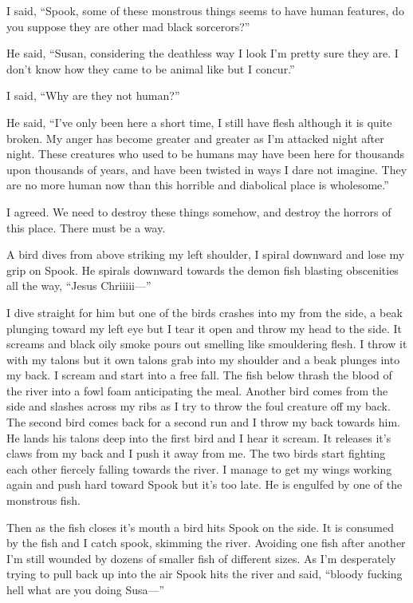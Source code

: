 I said, ``Spook, some of these monstrous things seems to have human features, do you suppose they are other mad black sorcerors?''

He said, ``Susan, considering the deathless way I look I'm pretty sure they are. I don't know how they came to be animal like but I concur.''

I said, ``Why are they not human?''

He said, ``I've only been here a short time, I still have flesh although it is quite broken. My anger has become greater and greater as I'm attacked night after night. These creatures who used to be humans may have been here for thousands upon thousands of years, and have been twisted in ways I dare not imagine. They are no more human now than this horrible and diabolical place is wholesome.''

I agreed. We need to destroy these things somehow, and destroy the horrors of this place. There must be a way.

A bird dives from above striking my left shoulder, I spiral downward and lose my grip on Spook. He spirals downward towards the demon fish blasting obscenities all the way, ``Jesus Chriiiii---''

I dive straight for him but one of the birds crashes into my from the side, a beak plunging toward my left eye but I tear it open and throw my head to the side. It screams and black oily smoke pours out smelling like smouldering flesh. I throw it with my talons but it own talons grab into my shoulder and a beak plunges into my back. I scream and start into a free fall. The fish below thrash the blood of the river into a fowl foam anticipating the meal. Another bird comes from the side and slashes across my ribs as I try to throw the foul creature off my back. The second bird comes back for a second run and I throw my back towards him. He  lands his talons deep into the first bird and I hear it scream. It releases it's claws from my back and I push it away from me. The two birds start fighting each other fiercely falling towards the river. I manage to get my wings working again and push hard toward Spook but it's too late. He is engulfed by one of the monstrous fish.

Then as the fish closes it's mouth a bird hits Spook on the side. It is consumed by the fish and I catch spook, skimming the river. Avoiding one fish after another I'm still wounded by dozens of smaller fish of different sizes. As I'm desperately trying to pull back up into the air Spook hits the river and said, ``bloody fucking hell what are you doing Susa---''

